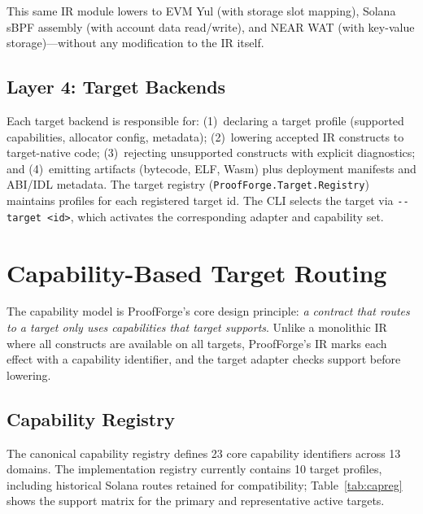 \documentclass[sigconf]{acmart}
\begin{document}
This same IR module lowers to EVM Yul (with storage slot mapping), Solana sBPF assembly (with
account data read/write), and NEAR WAT (with key-value storage)---without any modification to
the IR itself.

\subsection{Layer 4: Target Backends}

Each target backend is responsible for: (1)~declaring a target profile (supported capabilities,
allocator config, metadata); (2)~lowering accepted IR constructs to target-native code;
(3)~rejecting unsupported constructs with explicit diagnostics; and (4)~emitting artifacts
(bytecode, ELF, Wasm) plus deployment manifests and ABI/IDL metadata. The target registry
(\texttt{ProofForge.Target.Registry}) maintains profiles for each registered target id. The
CLI selects the target via \texttt{-{}-target~<id>}, which activates the corresponding adapter
and capability set.

\section{Capability-Based Target Routing}
\label{sec:cap}

The capability model is ProofForge's core design principle: \emph{a contract that routes to a
target only uses capabilities that target supports}. Unlike a monolithic IR where all constructs
are available on all targets, ProofForge's IR marks each effect with a capability identifier,
and the target adapter checks support before lowering.

\subsection{Capability Registry}

The canonical capability registry defines 23 core capability identifiers across 13 domains.
The implementation registry currently contains 10 target profiles, including historical
Solana routes retained for compatibility; Table~\ref{tab:capreg} shows the support matrix
for the primary and representative active targets.
\end{document}
